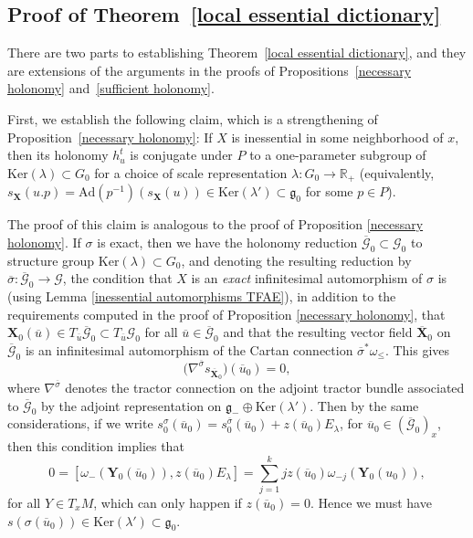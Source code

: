 \documentclass[11pt]{article}
\def\R{\mathbb{R}}
\def\g{\mathfrak{g}}
\def\Gbdle{\mathcal{G}}
\def\dsum{\oplus}
\theoremstyle{plain}
\theoremstyle{definition}
\begin{document}
\subsection{Proof of Theorem~\ref{local essential dictionary}} \label{section4.3}

There are two parts to establishing Theorem~\ref{local essential dictionary}, and they are extensions of the arguments in the proofs of Propositions~\ref{necessary holonomy} and~\ref{sufficient holonomy}.

First, we establish the following claim, which is a strengthening of Proposition~\ref{necessary holonomy}: If $X$ is inessential in some neighborhood of $x$, then its holonomy $h_u^t$ is conjugate under $P$ to a one-parameter subgroup of $\mathrm{Ker}(\lambda) \subset G_0$ for a choice of scale representation $\lambda: G_0 \rightarrow \R_+$ (equivalently, $s_{\mathbf{X}}(u.p) = \mathrm{Ad}(p^{-1})(s_{\mathbf{X}}(u)) \in \mathrm{Ker}(\lambda') \subset \g_0$ for some $p \in P$).

The proof of this claim is analogous to the proof of Proposition \ref{necessary holonomy}. If $\sigma$ is exact, then we have the holonomy reduction $\overline{\Gbdle}_0 \subset \Gbdle_0$ to structure group $\mathrm{Ker}(\lambda) \subset G_0$, and denoting the resulting reduction by $\overline{\sigma}: \overline{\Gbdle}_0 \rightarrow \Gbdle$, the condition that $X$ is an \emph{exact} inf\/initesimal automorphism of $\sigma$ is (using Lemma \ref{inessential automorphisms TFAE}), in addition to the requirements computed in the proof of Proposition \ref{necessary holonomy}, that $\mathbf{X}_0(\overline{u}) \in T_{\overline{u}}\overline{\Gbdle}_0 \subset T_{\overline{u}}\Gbdle_0$ for all $\overline{u} \in \overline{\Gbdle}_0$ and that the resulting vector f\/ield $\overline{\mathbf{X}}_0$ on $\overline{\Gbdle}_0$ is an inf\/initesimal automorphism of the Cartan connection $\overline{\sigma}^*\omega_{\leq}$. This gives
\[
\big(\nabla^{\overline{\sigma}} s_{\overline{\mathbf{X}}_0}\big)(\overline{u}_0) = 0,
\]
where $\nabla^{\overline{\sigma}}$ denotes the tractor connection on the adjoint tractor bundle associated to $\overline{\Gbdle}_0$ by the adjoint representation on $\g_- \dsum \mathrm{Ker}(\lambda')$. Then by the same considerations, if we write $s^{\sigma}_0(\overline{u}_0) = s^{\overline{\sigma}}_0(\overline{u}_0) + z(\overline{u}_0)E_{\lambda}$, for $\overline{u}_0 \in (\overline{\Gbdle}_0)_x$, then this condition implies that
\[
0 = [\omega_-(\mathbf{Y}_0(\overline{u}_0)),z(\overline{u}_0)E_{\lambda}] = \sum_{j=1}^k jz(\overline{u}_0)\omega_{-j}(\mathbf{Y}_0(u_0)),
\]
for all $Y \!\in\! T_xM$, which can only happen if $z(\overline{u}_0) = 0$. Hence we must have $s(\sigma(\overline{u}_0)) \!\in\! \mathrm{Ker}(\lambda') \!\subset\! \g_0$.
\end{document}
